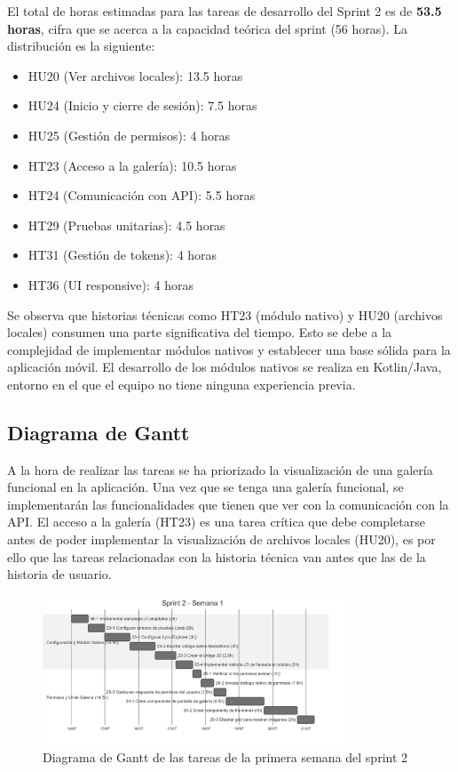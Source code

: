 El total de horas estimadas para las tareas de desarrollo del Sprint 2 es de \textbf{53.5 horas}, cifra que se acerca a la capacidad teórica del sprint (56 horas). La distribución es la siguiente:

\begin{itemize}
    \item HU20 (Ver archivos locales): 13.5 horas
    \item HU24 (Inicio y cierre de sesión): 7.5 horas
    \item HU25 (Gestión de permisos): 4 horas
    \item HT23 (Acceso a la galería): 10.5 horas
    \item HT24 (Comunicación con API): 5.5 horas
    \item HT29 (Pruebas unitarias): 4.5 horas
    \item HT31 (Gestión de tokens): 4 horas
    \item HT36 (UI responsive): 4 horas
\end{itemize}

Se observa que historias técnicas como HT23 (módulo nativo) y HU20 (archivos locales) consumen una parte significativa del tiempo. Esto se debe a la complejidad de implementar módulos nativos y establecer una base sólida para la aplicación móvil. El desarrollo de los módulos nativos se realiza en Kotlin/Java, entorno en el que el equipo no tiene ninguna experiencia previa.

\subsection{Diagrama de Gantt}
A la hora de realizar las tareas se ha priorizado la visualización de una galería funcional en la aplicación. Una vez que se tenga una galería funcional, se implementarán las funcionalidades que tienen que ver con la comunicación con la API. El acceso a la galería (HT23) es una tarea crítica que debe completarse antes de poder implementar la visualización de archivos locales (HU20), es por ello que las tareas relacionadas con la historia técnica van antes que las de la historia de usuario.

\begin{figure}[H]
    \begin{center}
        \includegraphics[width=0.8\textwidth]{assets/sprint2/week1-gantt.png}
    \end{center}
    \caption{Diagrama de Gantt de las tareas de la primera semana del sprint 2}\label{fig:gantt-sprint2-week1}
\end{figure}

